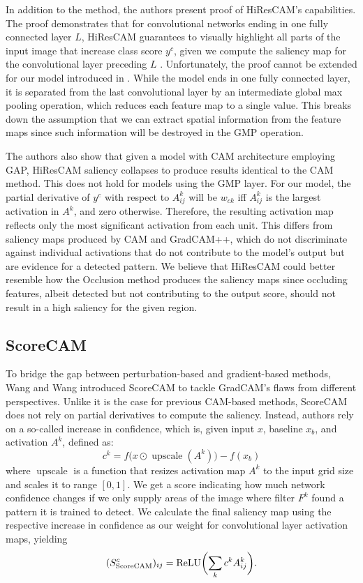In addition to the method, the authors present proof of HiResCAM's capabilities.
The proof demonstrates that for convolutional networks ending in one fully connected layer $L$, HiResCAM guarantees to visually highlight all parts of the input image that increase class score $y^c$, given we compute the saliency map for the convolutional layer preceding $L$ \cite{hires-cam}.
Unfortunately, the proof cannot be extended for our model introduced in .
While the model ends in one fully connected layer, it is separated from the last convolutional layer by an intermediate global max pooling operation, which reduces each feature map to a single value.
This breaks down the assumption that we can extract spatial information from the feature maps since such information will be destroyed in the GMP operation. 

The authors also show that given a model with CAM architecture employing GAP, HiResCAM saliency collapses to produce results identical to the CAM method.
This does not hold for models using the GMP layer.
For our model, the partial derivative of $y^c$ with respect to $A^k_{ij}$ will be $w_{ck}$ iff $A^k_{ij}$ is the largest activation in $A^k$, and zero otherwise.
Therefore, the resulting activation map reflects only the most significant activation from each unit.
This differs from saliency maps produced by CAM and GradCAM++, which do not discriminate against individual activations that do not contribute to the model's output but are evidence for a detected pattern.
We believe that HiResCAM could better resemble how the Occlusion method produces the saliency maps since occluding features, albeit detected but not contributing to the output score, should not result in a high saliency for the given region.

\subsection{ScoreCAM}

To bridge the gap between perturbation-based and gradient-based methods, Wang and Wang \cite{score-cam} introduced ScoreCAM to tackle GradCAM's flaws from different perspectives.
Unlike it is the case for previous CAM-based methods, ScoreCAM does not rely on partial derivatives to compute the saliency.
Instead, authors rely on a so-called increase in confidence, which is, given input $x$, baseline $x_b$, and activation $A^k$, defined as:
\begin{equation}
    c^k = f\bigl(x \odot \operatorname{upscale}(A^k)\bigr) - f(x_b)
\end{equation}
where $\operatorname{upscale}$ is a function that resizes activation map $A^k$ to the input grid size and scales it to range $[0, 1]$.
We get a score indicating how much network confidence changes if we only supply areas of the image where filter $F^k$ found a pattern it is trained to detect.
We calculate the final saliency map using the respective increase in confidence as our weight for convolutional layer activation maps, yielding
\begin{equation}
    (S^c_{\text{ScoreCAM}})_{ij} = \operatorname{ReLU}\biggl(\sum_k c^k A^k_{ij}\biggr).
\end{equation}

